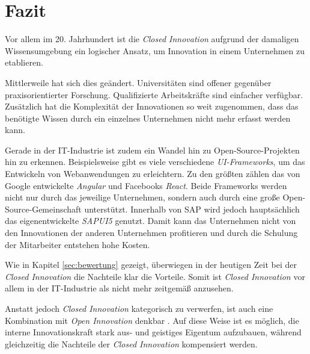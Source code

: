 \section{Fazit}\label{sec:fazit}
Vor allem im 20. Jahrhundert ist die \textit{Closed Innovation}
aufgrund der damaligen Wissensumgebung ein logischer Ansatz,
um Innovation in einem Unternehmen zu etablieren.

Mittlerweile hat sich dies geändert.
Universitäten sind offener gegenüber praxisorientierter Forschung.
Qualifizierte Arbeitskräfte sind einfacher verfügbar.
Zusätzlich hat die Komplexität der Innovationen so weit zugenommen,
dass das benötigte Wissen durch ein einzelnes Unternehmen nicht mehr erfasst werden kann.

Gerade in der IT-Industrie ist zudem ein Wandel hin zu Open-Source-Projekten hin zu erkennen.
Beispielsweise gibt es viele verschiedene \linebreak{}\textit{UI-Frameworks}, um das Entwickeln von Webanwendungen zu erleichtern.
Zu den größten zählen das von Google entwickelte \textit{Angular} und Facebooks \textit{React}.
Beide Frameworks werden nicht nur durch das jeweilige Unternehmen,
sondern auch durch eine große Open-Source-Gemeinschaft unterstützt.
Innerhalb von SAP wird jedoch hauptsächlich das eigenentwickelte \textit{SAPUI5} genutzt.
Damit kann das Unternehmen nicht von den Innovationen der anderen Unternehmen profitieren und
durch die Schulung der Mitarbeiter entstehen hohe Kosten.

Wie in Kapitel \ref{sec:bewertung} gezeigt, überwiegen in der heutigen Zeit bei der \textit{Closed Innovation}
die Nachteile klar die Vorteile.
Somit ist \textit{Closed Innovation} vor allem in der IT-Industrie als nicht mehr zeitgemäß anzusehen.

Anstatt jedoch \textit{Closed Innovation} kategorisch zu verwerfen,
ist auch eine Kombination mit \textit{Open Innovation} denkbar \cite{OpenInno32:online}.
Auf diese Weise ist es möglich, die interne Innovationskraft stark aus- und geistiges Eigentum aufzubauen,
während gleichzeitig die Nachteile der \textit{Closed Innovation} kompensiert werden.
